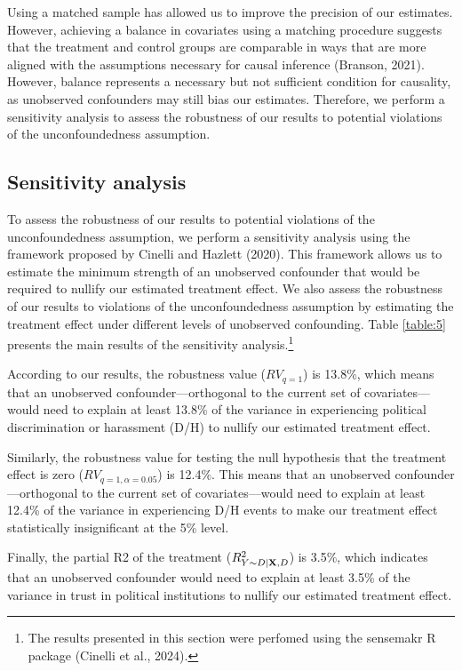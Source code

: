 \documentclass{article}
\begin{document}
Using a matched sample has allowed us to improve the precision of our estimates. However, achieving a balance in covariates using a matching procedure suggests that the treatment and control groups are comparable in ways that are more aligned with the assumptions necessary for causal inference (Branson, 2021). However, balance represents a necessary but not sufficient condition for causality, as unobserved confounders may still bias our estimates. Therefore, we perform a sensitivity analysis to assess the robustness of our results to potential violations of the unconfoundedness assumption.

\subsection{Sensitivity analysis}

To assess the robustness of our results to potential violations of the unconfoundedness assumption, we perform a sensitivity analysis using the framework proposed by Cinelli and Hazlett (2020). This framework allows us to estimate the minimum strength of an unobserved confounder that would be required to nullify our estimated treatment effect. We also assess the robustness of our results to violations of the unconfoundedness assumption by estimating the treatment effect under different levels of unobserved confounding. Table \ref{table:5} presents the main results of the sensitivity analysis.\footnote{The results presented in this section were perfomed using the sensemakr R package (Cinelli et al., 2024).}

According to our results, the robustness value ($RV_{q = 1}$) is 13.8\%, which means that an unobserved confounder—orthogonal to the current set of covariates—would need to explain at least 13.8\% of the variance in experiencing political discrimination or harassment (D/H) to nullify our estimated treatment effect.

Similarly, the robustness value for testing the null hypothesis that the treatment effect is zero ($RV_{q = 1, \alpha = 0.05}$) is 12.4\%. This means that an unobserved confounder—orthogonal to the current set of covariates—would need to explain at least 12.4\% of the variance in experiencing D/H events to make our treatment effect statistically insignificant at the 5\% level.

Finally, the partial R2 of the treatment ($R^2_{Y\sim D| {\bf X}, D}$) is 3.5\%, which indicates that an unobserved confounder would need to explain at least 3.5\% of the variance in trust in political institutions to nullify our estimated treatment effect.
\end{document}
